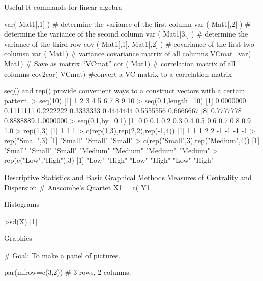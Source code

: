 
Useful R commands for linear algebra

 
 
var( Mat1[,1] )                                          # determine the variance of the first column
var ( Mat1[,2] )                                          # determine the variance of the second column
var ( Mat1[3,] )                                          # determine the variance of the third row
cov ( Mat1[,1], Mat1[,2] )              # covariance of the first two columsn
var ( Mat1)                                          # variance covariance matrix of all columns
VCmat=var( Mat1)                            # Save as matrix “VCmat”
cor ( Mat1)                                          # correlation matrix of all columns
cov2cor( VCmat)                            #convert a VC matrix to a correlation matrix
 
seq() and rep() provide convenient ways to a construct vectors with a certain pattern. 
> seq(10) 
 [1]  1  2  3  4  5  6  7  8  9 10 
> seq(0,1,length=10) 
 [1] 0.0000000 0.1111111 0.2222222 0.3333333 0.4444444 0.5555556 0.6666667 
 [8] 0.7777778 0.8888889 1.0000000 
> seq(0,1,by=0.1) 
 [1] 0.0 0.1 0.2 0.3 0.4 0.5 0.6 0.7 0.8 0.9 1.0 
> rep(1,3) 
[1] 1 1 1 
> c(rep(1,3),rep(2,2),rep(-1,4)) 
[1]  1  1  1  2  2 -1 -1 -1 -1 
> rep("Small",3) 
[1] "Small" "Small" "Small" 
> c(rep("Small",3),rep("Medium",4)) 
[1] "Small"  "Small"  "Small"  "Medium" "Medium" "Medium" "Medium" 
> rep(c("Low","High"),3) 
[1] "Low"  "High" "Low"  "High" "Low"  "High"

Descriptive Statistics and Basic Graphical Methods
Measures of Centrality and Dispersion
# Anscombe’s  Quartet
X1 = c(
Y1 =

Histograms
 
>sd(X)
[1]
 
 
 




Graphics

# Goal: To make a panel of pictures.

par(mfrow=c(3,2))                       # 3 rows, 2 columns.

